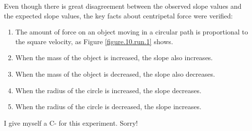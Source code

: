 Even though there is great disagreement between the observed slope values and the expected slope values, the key facts about centripetal force were verified:
\begin{enumerate}
    \item The amount of force on an object moving in a circular path is proportional to the square velocity, as Figure \ref{figure.10.run.1} shows.
    \item When the mass of the object is increased, the slope also increases.
    \item When the mass of the object is decreased, the slope also decreases.
    \item When the radius of the circle is increased, the slope decreases.
    \item When the radius of the circle is decreased, the slope increases.
\end{enumerate}
I give myself a C- for this experiment. Sorry!
%
